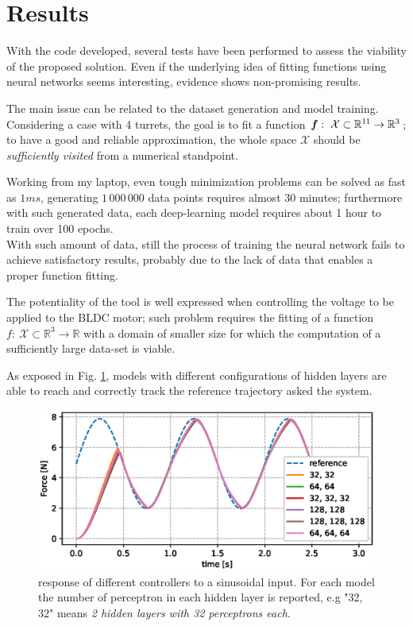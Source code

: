 \section{Results} \label{sec:results}
With the code developed, several tests have been performed to assess the viability of the proposed solution. Even if the underlying idea of fitting functions using neural networks seems interesting, evidence shows non-promising results.

The main issue can be related to the dataset generation and model training. Considering a case with 4 turrets, the goal is to fit a function $\boldsymbol{f}:\ \mathcal X \subset \mathbb R^{11} \rightarrow \mathbb R^{3}$; to have a good and reliable approximation, the whole space $\mathcal X$ should be \textit{sufficiently visited} from a numerical standpoint.

Working from my laptop, even tough minimization problems can be solved as fast as $1ms$, generating $1\,000\,000$ data points requires almost 30 minutes; furthermore with such generated data, each deep-learning model requires about 1 hour to train over 100 epochs. \\
With such amount of data, still the process of training the neural network fails to achieve satisfactory results, probably due to the lack of data that enables a proper function fitting.

\vspace{3mm}
The potentiality of the tool is well expressed when controlling the voltage to be applied to the BLDC motor; such problem requires the fitting of a function $f:\ \mathcal X \subset \mathbb R^{3} \rightarrow \mathbb R$ with a domain of smaller size for which the computation of a sufficiently large data-set is viable.

As exposed in Fig. \ref{fig:motorNN}, models with different configurations of hidden layers are able to reach and correctly track the reference trajectory asked the system.
\begin{figure}[bt]
    \centering
    \includegraphics[width=\linewidth]{Images/motorNN.eps}
    \caption{response of different controllers to a sinusoidal input. For each model the number of perceptron in each hidden layer is reported, e.g "32, 32" means \textit{2 hidden layers with 32 perceptrons each}.}
    \label{fig:motorNN}
\end{figure}

